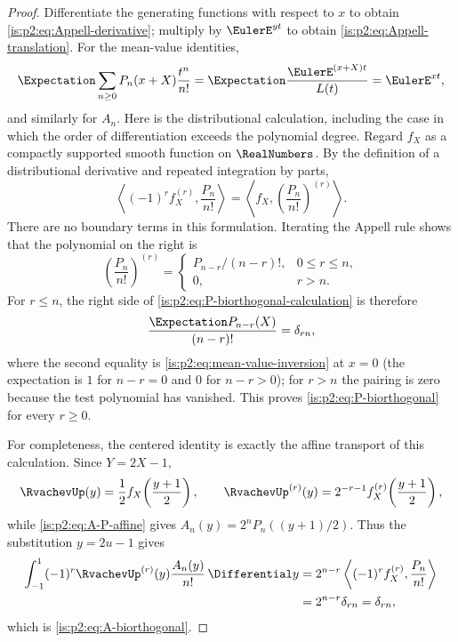 \begin{proof}
Differentiate the generating functions with respect to $x$ to obtain
\eqref{is:p2:eq:Appell-derivative}; multiply by $\EulerE^{yt}$ to obtain
\eqref{is:p2:eq:Appell-translation}.  For the mean-value identities,
\[
 \Expectation\sum_{n\ge0}P_n(x+X)\frac{t^n}{n!}
 =\Expectation\frac{\EulerE^{(x+X)t}}{L(t)}=\EulerE^{xt},
\]
and similarly for $A_n$.  Here is the distributional calculation, including
the case in which the order of differentiation exceeds the polynomial degree.
Regard $f_X$ as a compactly supported smooth function on $\RealNumbers$.  By
the definition of a distributional derivative and repeated integration by
parts,
\begin{equation}
 \left\langle(-1)^r f_X^{(r)},\frac{P_n}{n!}\right\rangle
 =\left\langle f_X,
   \left(\frac{P_n}{n!}\right)^{(r)}\right\rangle.
 \label{is:p2:eq:P-biorthogonal-calculation}
\end{equation}
There are no boundary terms in this formulation.  Iterating the Appell rule
shows that the polynomial on the right is
\[
 \left(\frac{P_n}{n!}\right)^{(r)}
 =\begin{cases}
   P_{n-r}/(n-r)!,&0\le r\le n,\\
   0,&r>n.
  \end{cases}
\]
For $r\le n$, the right side of
\eqref{is:p2:eq:P-biorthogonal-calculation} is therefore
\[
 \frac{\Expectation P_{n-r}(X)}{(n-r)!}
 =\delta_{rn},
\]
where the second equality is \eqref{is:p2:eq:mean-value-inversion} at $x=0$
(the expectation is $1$ for $n-r=0$ and $0$ for $n-r>0$); for $r>n$ the
pairing is zero because the test polynomial has vanished.  This proves
\eqref{is:p2:eq:P-biorthogonal} for every $r\ge0$.

For completeness, the centered identity is exactly the affine transport of
this calculation.  Since $Y=2X-1$,
\[
 \RvachevUp(y)=\frac12 f_X\!\left(\frac{y+1}{2}\right),
 \qquad
 \RvachevUp^{(r)}(y)=2^{-r-1}f_X^{(r)}\!\left(\frac{y+1}{2}\right),
\]
while \eqref{is:p2:eq:A-P-affine} gives
$A_n(y)=2^nP_n((y+1)/2)$.  Thus the substitution $y=2u-1$ gives
\begin{align*}
 \int_{-1}^{1}(-1)^r\RvachevUp^{(r)}(y)
       \frac{A_n(y)}{n!}\,\Differential y
 &=2^{n-r}
   \left\langle(-1)^r f_X^{(r)},\frac{P_n}{n!}\right\rangle\\
 &=2^{n-r}\delta_{rn}=\delta_{rn},
\end{align*}
which is \eqref{is:p2:eq:A-biorthogonal}.
\end{proof}

